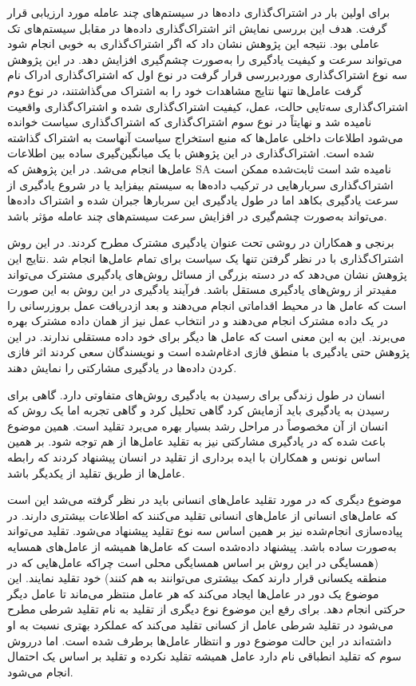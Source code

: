 برای اولین بار در اشتراک‌گذاری داده‌ها در سیستم‌های چند عامله مورد ارزیابی قرار گرفت. هدف این بررسی نمایش اثر اشتراک‌گذاری داده‌ها در مقابل سیستم‌های تک عاملی بود. نتیجه این پژوهش نشان داد که اگر اشتراک‌گذاری به خوبی انجام شود می‌تواند سرعت و کیفیت یادگیری را به‌صورت چشم‌گیری افزایش دهد. در این پژوهش سه نوع اشتراک‌گذاری موردبررسی قرار گرفت در نوع اول که اشتراک‌گذاری ادراک نام گرفت عامل‌ها تنها نتایج مشاهدات خود را به اشتراک می‌گذاشتند، در نوع دوم اشتراک‌گذاری سه‌تایی حالت، عمل، کیفیت اشتراک‌گذاری شده و اشتراک‌گذاری واقعیت نامیده شد و نهایتاً در نوع سوم اشتراک‌گذاری که اشتراک‌گذاری سیاست خوانده می‌شود اطلاعات داخلی عامل‌ها که منبع استخراج سیاست آنهاست به اشتراک گذاشته‌ شده است. اشتراک‌گذاری در این پژوهش با یک میانگین‌گیری ساده بین اطلاعات عامل‌ها انجام می‌شد. در این پژوهش که SA نامیده شد است ثابت‌شده ممکن است اشتراک‌گذاری سربارهایی در ترکیب داده‌ها به سیستم بیفزاید یا در شروع یادگیری از سرعت یادگیری بکاهد اما در طول یادگیری این سربارها جبران شده و اشتراک داده‌ها می‌تواند به‌صورت چشم‌گیری در افزایش سرعت سیستم‌های چند عامله مؤثر باشد.


برنجی و همکاران در  روشی تحت عنوان یادگیری مشترک مطرح کردند. در این روش اشتراک‌گذاری با در نظر گرفتن تنها یک سیاست برای تمام عامل‌ها انجام شد .نتایج این پژوهش نشان می‌دهد که در دسته بزرگی از مسائل روش‌های یادگیری مشترک می‌تواند مفیدتر از روش‌های یادگیری مستقل باشد. فرآیند یادگیری در این روش به این صورت است که عامل ها در محیط اقداماتی انجام می‌دهند و بعد ازدریافت عمل بروزرسانی را در یک داده مشترک انجام می‌دهند و در انتخاب عمل نیز از همان داده مشترک بهره می‌برند. این به این معنی است که عامل ها دیگر برای خود داده مستقلی ندارند. در این پژوهش حتی یادگیری با منطق فازی ادغام‌شده است و نویسندگان سعی کردند اثر فازی کردن داده‌ها در یادگیری مشارکتی را نمایش دهند.

انسان در طول زندگی برای رسیدن به یادگیری روش‌های متفاوتی دارد. گاهی برای رسیدن به یادگیری باید آزمایش کرد گاهی تحلیل کرد و گاهی تجربه اما یک روش که انسان از آن مخصوصاً در مراحل رشد بسیار بهره می‌برد تقلید است. همین موضوع باعث شده که در یادگیری مشارکتی نیز به تقلید عامل‌ها از هم توجه شود. بر همین اساس نونس و همکاران با ایده برداری از تقلید در انسان پیشنهاد کردند که رابطه عامل‌ها از طریق تقلید از یکدیگر باشد.

موضوع دیگری که در مورد تقلید عامل‌های انسانی باید در نظر گرفته می‌شد این است که عامل‌های انسانی از عامل‌های انسانی تقلید می‌کنند که اطلاعات بیشتری دارند. در پیاده‌سازی انجام‌شده نیز بر همین اساس سه نوع تقلید پیشنهاد می‌شود. تقلید می‌تواند به‌صورت ساده باشد. پیشنهاد داده‌شده است که عامل‌ها همیشه از عامل‌های همسایه (همسایگی در این روش بر اساس همسایگی محلی است چراکه عامل‌هایی که در منطقه یکسانی قرار دارند کمک بیشتری می‌توانند به هم کنند) خود تقلید نمایند. این موضوع یک دور در عامل‌ها ایجاد می‌کند که هر عامل منتظر می‌ماند تا عامل دیگر حرکتی انجام دهد. برای رفع این موضوع نوع دیگری از تقلید به نام تقلید شرطی مطرح می‌شود در تقلید شرطی عامل از کسانی تقلید می‌کند که عملکرد بهتری نسبت به او داشته‌اند در این حالت موضوع دور و انتظار عامل‌ها برطرف شده است. اما درروش سوم که تقلید انطباقی نام دارد عامل همیشه تقلید نکرده و تقلید بر اساس یک احتمال انجام می‌شود.


